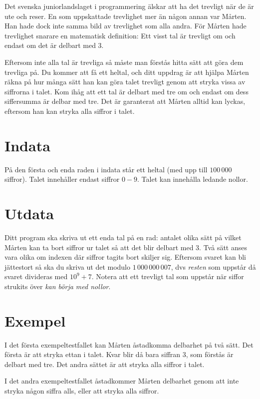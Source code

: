 Det svenska juniorlandslaget i programmering älskar att ha det trevligt när de är ute och reser. En som uppskattade trevlighet mer än någon annan var Mårten. Han hade dock inte samma bild av trevlighet som alla andra. För Mårten hade trevlighet snarare en matematisk definition: Ett visst tal är trevligt om och endast om det är delbart med 3.

Eftersom inte alla tal är trevliga så måste man förstås hitta sätt att göra dem trevliga på. Du kommer att få ett heltal, och ditt uppdrag är att hjälpa Mårten räkna på hur många sätt han kan göra talet trevligt genom att stryka vissa av siffrorna i talet. Kom ihåg att ett tal är delbart med tre om och endast om dess siffersumma är delbar med tre. Det är garanterat att Mårten alltid kan lyckas, eftersom han kan stryka alla siffror i talet.

\section*{Indata}
På den första och enda raden i indata står ett heltal (med upp till $100\,000$ siffror). Talet innehåller endast siffror $0-9$. Talet kan innehålla ledande nollor.

\section*{Utdata}
Ditt program ska skriva ut ett enda tal på en rad: antalet olika sätt på vilket Mårten kan ta bort siffror ur talet så att det blir delbart med 3. Två sätt anses vara olika om indexen där siffror tagits bort skiljer sig. Eftersom svaret kan bli jättestort så ska du skriva ut det modulo $1\,000\,000\,007$, dvs \emph{resten} som uppstår då svaret divideras med $10^9 + 7$. Notera att ett trevligt tal som uppstår när siffor strukits över \emph{kan börja med nollor}.

\section*{Exempel}
I det första exempeltestfallet kan Mårten åstadkomma delbarhet på två sätt. Det första är att stryka ettan i talet. Kvar blir då bara siffran 3, som förstås är delbart med tre. Det andra sättet är att stryka alla siffror i talet.

I det andra exempeltestfallet åstadkommer Mårten delbarhet genom att inte stryka någon siffra alls, eller att stryka alla siffror.

